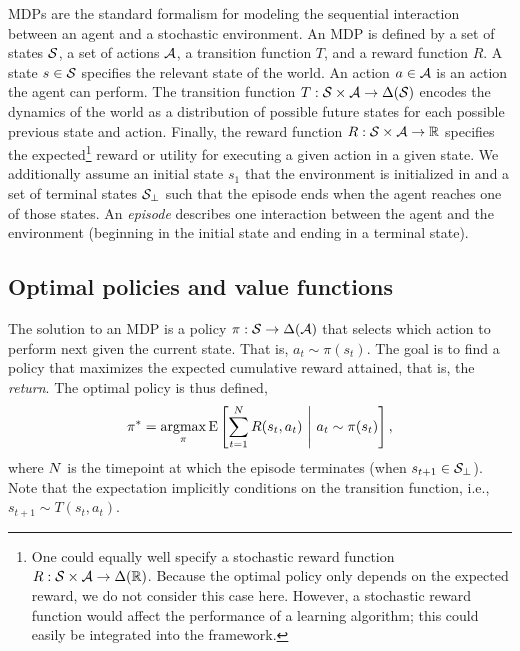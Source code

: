 MDPs are the standard formalism for modeling the sequential interaction between an agent and a stochastic environment. An MDP is defined by a set of states $\S$, a set of actions $\A$, a transition function $T$, and a reward function $R$. A state $s \in \S$ specifies the relevant state of the world. An action $a \in \A$ is an action the agent can perform. The transition function $T: \S \times \A \rightarrow \Delta(\S)$\footnotemark{} encodes the dynamics of the world as a distribution of possible future states for each possible previous state and action. Finally, the reward function $R: \S \times \A \rightarrow \R $ specifies the expected\footnote{%
  One could equally well specify a stochastic reward function $R: \S \times \A \rightarrow \Delta(\R)$. Because the optimal policy only depends on the expected reward, we do not consider this case here. However, a stochastic reward function would affect the performance of a learning algorithm; this could easily be integrated into the framework.
} reward or utility for executing a given action in a given state. We additionally assume an initial state $s_1$ that the environment is initialized in and a set of terminal states $\S_\bot$ such that the episode ends when the agent reaches one of those states. An \emph{episode} describes one interaction between the agent and the environment (beginning in the initial state and ending in a terminal state).



\subsection{Optimal policies and value functions}

The solution to an MDP is a policy $\pi: \S \rightarrow \Delta(\A)$ that selects which action to perform next given the current state. That is, $a_t \sim \pi(s_t)$. The goal is to find a policy that maximizes the expected cumulative reward attained, that is, the \emph{return}. The optimal policy is thus defined,
\begin{equation}\label{eq:optimal-policy}
  \pi^* = \argmax_\pi \expect{
    \sum_{t=1}^{\tmax} R(s_t, a_t)
  }{
   a_t \sim \pi(s_t)
  },
\end{equation}
where $\tmax$ is the timepoint at which the episode terminates (when $s_{t+1} \in \S_\bot$). Note that the expectation implicitly conditions on the transition function, i.e., $s_{t+1} \sim T(s_t, a_t)$.

